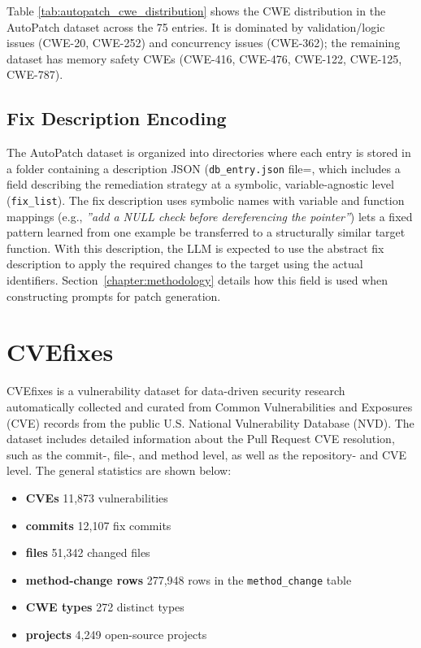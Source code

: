 Table \ref{tab:autopatch_cwe_distribution} shows the CWE distribution in the AutoPatch dataset across the 75 entries. It is dominated by validation/logic issues (CWE-20, CWE-252) and concurrency issues (CWE-362); the remaining dataset has memory safety CWEs (CWE-416, CWE-476, CWE-122, CWE-125, CWE-787).

\subsection{Fix Description Encoding}
 
The AutoPatch dataset is organized into directories where each entry is stored in a folder containing a description JSON (\texttt{db\_entry.json} file=, which includes a field describing the remediation strategy at a symbolic, variable-agnostic level (\texttt{fix\_list}).
The fix description uses symbolic names with variable and function
mappings (e.g., \textit{''add a NULL check before dereferencing the
pointer''}) lets a fixed pattern learned from one example
be transferred to a structurally similar target function. 
With this description, the LLM is expected to use the abstract fix description to apply the required changes to the target using the actual identifiers. 
Section~\ref{chapter:methodology} details how this field is used when constructing prompts for patch generation.

\section{CVEfixes}\label{sec:cvefixes}

CVEfixes\cite{moonen2024cvefixes} is a vulnerability dataset for data-driven security research automatically collected and curated from Common Vulnerabilities and Exposures (CVE) records from the public U.S. National Vulnerability Database (NVD). 
The dataset includes detailed information about the Pull Request CVE resolution, such as the commit-, file-, and method level, as well as the repository- and CVE level.
The general statistics are shown below: 

\begin{itemize}
    \item\textbf{CVEs} 11,873 vulnerabilities
    \item\textbf{commits} 12,107 fix commits
    \item\textbf{files} 51,342 changed files
    \item\textbf{method-change rows} 277,948 rows in the \texttt{method\_change} table
    \item\textbf{CWE types} 272 distinct types
    \item\textbf{projects} 4,249 open-source projects
\end{itemize}

